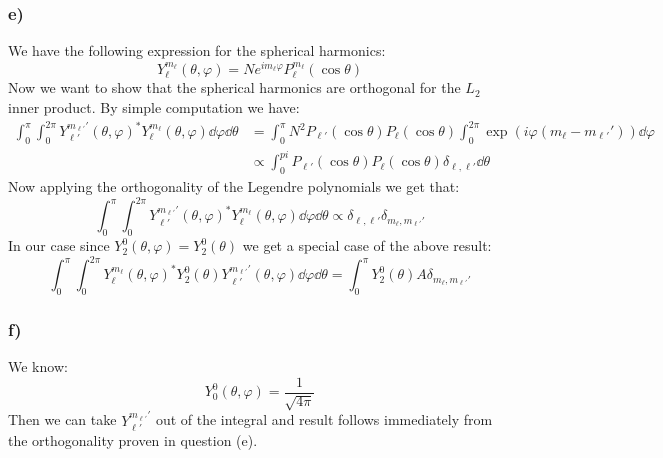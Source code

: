 \documentclass[10pt,a4paper]{book}
\begin{document}
\subsubsection*{e)}
We have the following expression for the spherical harmonics:
\[
Y_\ell^{m_\ell} (\theta, \varphi) = N e^{i m_\ell \varphi } P_\ell^{m_\ell} (\cos \theta) 
\]
Now we want to show that the spherical harmonics are orthogonal for the $L_2$ inner product. By simple computation we have:
\begin{align*}
\int_0^\pi \int_0^{2\pi} Y_{\ell'}^{m_{\ell'}'}(\theta,\varphi)^* Y_{\ell}^{m_\ell} (\theta, \varphi) \dd \varphi \dd \theta &= \int_0^{\pi} N^2 P_{\ell'}(\cos \theta) P_\ell (\cos \theta) \int_0^{2\pi} \exp(i \varphi(m_\ell - m_{\ell'}')) \dd \varphi \\
&\propto \int_0^{pi} P_{\ell'}(\cos \theta) P_\ell (\cos\theta) \delta_{\ell, \ell'} \dd \theta 
\end{align*}
Now applying the orthogonality of the Legendre polynomials we get that:
\[
\int_0^\pi \int_0^{2\pi} Y_{\ell'}^{m_{\ell'}'}(\theta,\varphi)^* Y_{\ell}^{m_\ell} (\theta, \varphi) \dd \varphi \dd \theta \propto \delta_{\ell, \ell'} \delta_{m_\ell, m_{\ell'}'}
\]
In our case since $Y_{2}^0(\theta, \varphi) = Y_2^0(\theta)$ we get a special case of the above result:
\[
\int_{0}^\pi \int_0^{2\pi} Y_{\ell}^{m_\ell}(\theta, \varphi)^* Y_2^0 (\theta) Y_{\ell'}^{m_{\ell'}'}(\theta, \varphi) \dd \varphi \dd \theta = \int_0^{\pi} Y_2^0(\theta) A \delta_{m_\ell, m_{\ell'}'}
\]

\subsubsection*{f)}
We know:
\[
Y_0^0(\theta, \varphi) = \frac{1}{\sqrt{4 \pi}}
\]
Then we can take $Y_{\ell'}^{m_{\ell'}'}$ out of the integral and result follows immediately from the orthogonality proven in question (e).
\end{document}
